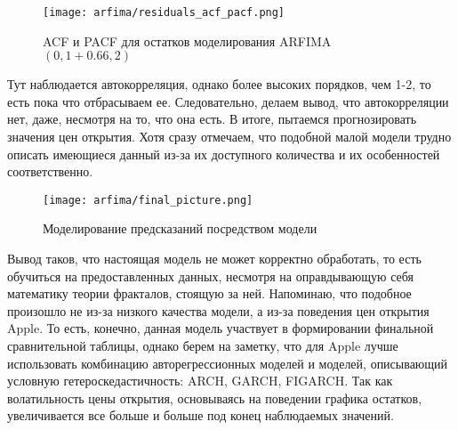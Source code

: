 \begin{enumerate}
	\begin{figure}[H]
		\centering
		\texttt{[image: arfima/residuals\_acf\_pacf.png]}
		\caption{ACF и PACF для остатков моделирования ARFIMA$(0, 1 + 0.66, 2)$}
	\end{figure} 
	\noindent Тут наблюдается автокорреляция, однако более высоких порядков, чем 1-2, то есть пока что отбрасываем ее. Следовательно, делаем вывод, что автокорреляции нет, даже, несмотря на то, что она есть. В итоге, пытаемся прогнозировать значения цен открытия. Хотя сразу отмечаем, что подобной малой модели трудно описать имеющиеся данный из-за их доступного количества и их особенностей соответственно.
	\begin{figure}[H]
		\centering
		\texttt{[image: arfima/final\_picture.png]}
		\caption{Моделирование предсказаний посредством модели}
	\end{figure}
\end{enumerate}
\noindent Вывод таков, что настоящая модель не может корректно обработать, то есть обучиться на предоставленных данных, несмотря на оправдывающую себя математику теории фракталов, стоящую за ней. Напоминаю, что подобное произошло не из-за низкого качества модели, а из-за поведения цен открытия Apple. То есть, конечно, данная модель участвует в формировании финальной сравнительной таблицы, однако берем на заметку, что для Apple лучше использовать комбинацию авторегрессионных моделей и моделей, описывающий условную гетероскедастичность: ARCH, GARCH, FIGARCH. Так как волатильность цены открытия, основываясь на поведении графика остатков, увеличивается все больше и больше под конец наблюдаемых значений.